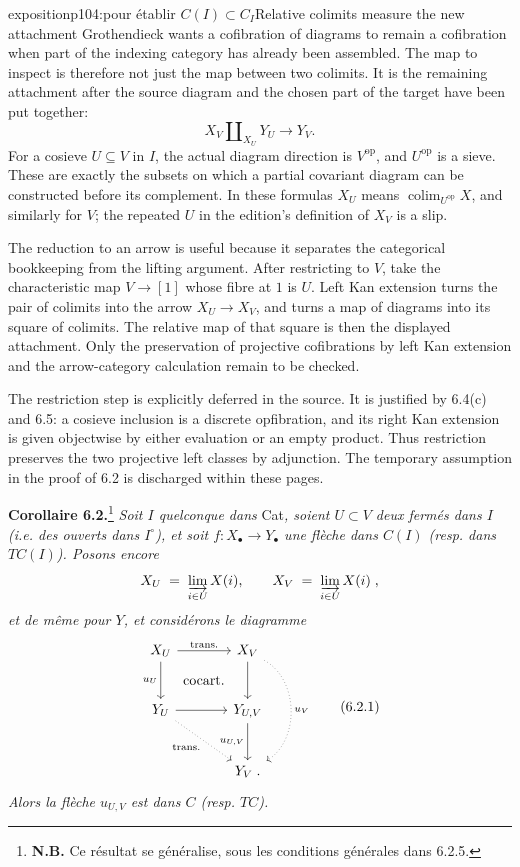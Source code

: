 \begin{dcomment}{exposition}{p104:pour établir $C(I) \subset C_I$}{Relative colimits measure the new attachment}
Grothendieck wants a cofibration of diagrams to remain a cofibration when part of the indexing category has already been assembled. The map to inspect is therefore not just the map between two colimits. It is the remaining attachment after the source diagram and the chosen part of the target have been put together:
\[
 X_V\amalg_{X_U}Y_U\longrightarrow Y_V.
\]
For a cosieve $U\subseteq V$ in $I$, the actual diagram direction is $V^{\mathrm{op}}$, and $U^{\mathrm{op}}$ is a sieve. These are exactly the subsets on which a partial covariant diagram can be constructed before its complement. In these formulas $X_U$ means $\operatorname{colim}_{U^{\mathrm{op}}}X$, and similarly for $V$; the repeated $U$ in the edition's definition of $X_V$ is a slip.

The reduction to an arrow is useful because it separates the categorical bookkeeping from the lifting argument. After restricting to $V$, take the characteristic map $V\to[1]$ whose fibre at $1$ is $U$. Left Kan extension turns the pair of colimits into the arrow $X_U\to X_V$, and turns a map of diagrams into its square of colimits. The relative map of that square is then the displayed attachment. Only the preservation of projective cofibrations by left Kan extension and the arrow-category calculation remain to be checked.

The restriction step is explicitly deferred in the source. It is justified by 6.4(c) and 6.5: a cosieve inclusion is a discrete opfibration, and its right Kan extension is given objectwise by either evaluation or an empty product. Thus restriction preserves the two projective left classes by adjunction. The temporary assumption in the proof of 6.2 is discharged within these pages.
\end{dcomment}


\textbf{Corollaire 6.2.}\footnote[31]{\textbf{N.B.} Ce résultat se généralise, sous les conditions générales dans 6.2.5.} \textit{Soit $I$ quelconque dans} Cat\textit{, soient $U \subset V$ deux fermés dans $I$ (i.e. des ouverts dans $I^{\circ}$), et soit $f : X_{\bullet} \longrightarrow Y_{\bullet}$ une flèche dans $C(I)$ (resp. dans $TC(I)$). Posons encore}
\[
X_U \;=\; \varinjlim_{i\in U} X(i), \qquad X_V \;=\; \varinjlim_{i\in U} X(i)\;, %
\]
\textit{et de même pour $Y$, et considérons le diagramme}
\[
\begin{tikzcd}[row sep=large, column sep=large]
X_U \arrow[r, "\text{trans.}"] \arrow[d, "u_U"'] \arrow[dr, phantom, "\text{cocart.}"] & X_V \arrow[d] \arrow[dd, dotted, bend left=60, "u_V"] \\
Y_U \arrow[r] \arrow[dr, dotted, "\text{trans.}"'] & Y_{U,V} \arrow[d, "u_{U,V}"'] \\
 & Y_V\;.
\end{tikzcd}
\tag*{(6.2.1)}
\]
\textit{Alors la flèche $u_{U,V}$ est dans $C$ (resp. $TC$).}

